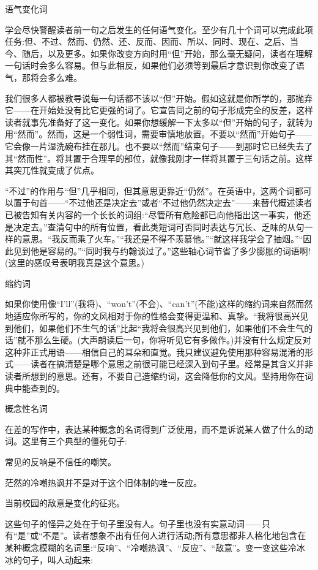 语气变化词

学会尽快警醒读者前一句之后发生的任何语气变化。至少有几十个词可以完成此项任务:但、不过、然而、仍然、还、反而、因而、所以、同时、现在、之后、当今、随后，以及更多。如果你改变方向时用“但”开始，那么毫无疑问，读者在理解一句话时会多么容易。但与此相反，如果他们必须等到最后才意识到你改变了语气，那将会多么难。

我们很多人都被教导说每一句话都不该以“但”开始。假如这就是你所学的，那抛弃它——在开始处没有比它更强的词了。它宣告同之前的句子形成完全的反差，这样读者就事先准备好了这一变化。如果你想缓解一下太多以“但”开始的句子，就转为用“然而”。然而，这是一个弱性词，需要审慎地放置。不要以“然而”开始句子——它会像一片湿洗碗布挂在那儿。也不要以“然而”结束句子——到那时它已经失去了其“然而性”。将其置于合理早的部位，就像我刚才一样将其置于三句话之前。这样其突兀性就变成了优点。

“不过”的作用与“但”几乎相同，但其意思更靠近“仍然”。在英语中，这两个词都可以置于句首——“不过他还是决定去”或者“不过他仍然决定去”——来替代概述读者已被告知有关内容的一个长长的词组:“尽管所有危险都已向他指出这一事实，他还是决定去。”查清句中的所有位置，看此类短词可否同时表达与冗长、乏味的从句一样的意思。“我反而乘了火车。”“我还是不得不羡慕他。”“就这样我学会了抽烟。”“因此见到他是容易的。”“同时我与约翰谈过了。”这些轴心词节省了多少膨胀的词语啊!(这里的感叹号表明我真是这个意思。)

缩约词

如果你使用像“I'll”(我将)、“won’t”(不会)、“can’t”(不能)这样的缩约词来自然而然地适应你所写的，你的文风相对于你的性格会变得更温和、真挚。“我将很高兴见到他们，如果他们不生气的话”比起“我将会很高兴见到他们，如果他们不会生气的话”就不那么生硬。(大声朗读后一句，你将听见它有多做作。)并没有什么规定反对这种非正式用语——相信自己的耳朵和直觉。我只建议避免使用那种容易混淆的形式——读者在搞清楚是哪个意思之前很可能已经深入到句子里。经常是其含义并非读者所想到的意思。还有，不要自己造缩约词，这会降低你的文风。坚持用你在词典中能查到的。

概念性名词

在差的写作中，表达某种概念的名词得到广泛使用，而不是诉说某人做了什么的动词。这里有三个典型的僵死句子:

常见的反响是不信任的嘲笑。

茫然的冷嘲热讽并不是对于这个旧体制的唯一反应。

当前校园的敌意是变化的征兆。

这些句子的怪异之处在于句子里没有人。句子里也没有实意动词——只有“是”或“不是”。读者想象不出有任何人进行活动;所有意思都非人格化地包含在某种概念模糊的名词里:“反响”、“冷嘲热讽”、“反应”、“敌意”。变一变这些冷冰冰的句子，叫人动起来:

